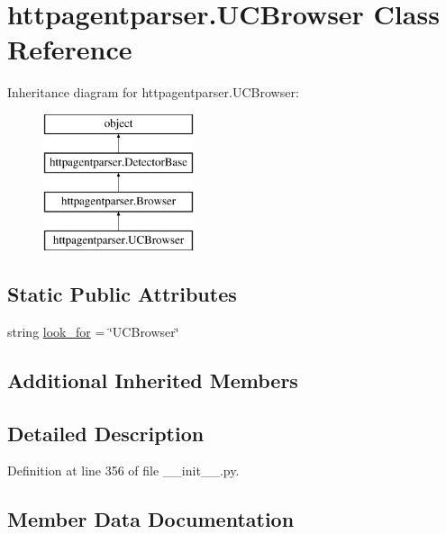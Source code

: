 \hypertarget{classhttpagentparser_1_1_u_c_browser}{}\section{httpagentparser.\+U\+C\+Browser Class Reference}
\label{classhttpagentparser_1_1_u_c_browser}
Inheritance diagram for httpagentparser.\+U\+C\+Browser\+:\begin{figure}[H]
\begin{center}
\leavevmode
\includegraphics[height=4.000000cm]{classhttpagentparser_1_1_u_c_browser}
\end{center}
\end{figure}
\subsection*{Static Public Attributes}
\begin{DoxyCompactItemize}
\item 
string \hyperlink{classhttpagentparser_1_1_u_c_browser_ac13f0622c9557b4468c13976c604304d}{look\+\_\+for} = \char`\"{}U\+C\+Browser\char`\"{}
\end{DoxyCompactItemize}
\subsection*{Additional Inherited Members}


\subsection{Detailed Description}


Definition at line 356 of file \+\_\+\+\_\+init\+\_\+\+\_\+.\+py.



\subsection{Member Data Documentation}
\hypertarget{classhttpagentparser_1_1_u_c_browser_ac13f0622c9557b4468c13976c604304d}{}\label{classhttpagentparser_1_1_u_c_browser_ac13f0622c9557b4468c13976c604304d} 
